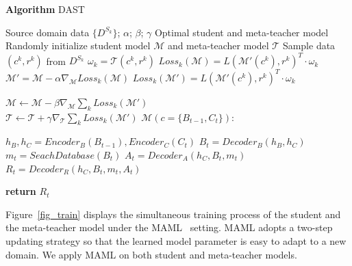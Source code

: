 \documentclass[letterpaper]{article} %
\begin{document}
\begin{algorithm}[t] %
\caption*{\textbf{Algorithm} DAST} %
\label{alg1} %
\begin{algorithmic}
    \renewcommand{\algorithmicrequire}{\textbf{Input:}}
    \REQUIRE Source domain data $\{D^{S_k}\}$; $\alpha$; $\beta$; $\gamma$
    \renewcommand{\algorithmicensure}{\textbf{Output:}}
    \ENSURE Optimal student and meta-teacher model
        \STATE Randomly initialize student model $\mathcal{M}$ and meta-teacher model $\mathcal{T}$
        \STATE Sample data $(c^k, {r}^k)$ from $D^{S_k}$
        \STATE $\omega_k = \mathcal{T}(c^k, {r}^k)$
        \STATE $Loss_k(\mathcal{M})={\mathit{L}(\mathcal{M'}(c^k),{r}^k)}^T\cdot \omega_k$
        \STATE $\mathcal{M}'=\mathcal{M}-\alpha \nabla_{\mathcal{M}}Loss_k(\mathcal{M})$
        \STATE $Loss_k(\mathcal{M'})={\mathit{L}(\mathcal{M'}(c^k),{r}^k)}^T\cdot \omega_k$
    \ENDFOR

    $\mathcal{M} \leftarrow \mathcal{M} - \beta \nabla_{\mathcal{M}} \sum_{k} Loss_k(\mathcal{M}')$\\
    $\mathcal{T} \leftarrow \mathcal{T} + \gamma \nabla_{\mathcal{T}} \sum_{k} Loss_k(\mathcal{M}')$
    \ENDWHILE
    \STATE
    \renewcommand{\algorithmicrequire}{\textbf{Student Model}}
    \REQUIRE $\mathcal{M}(c=\{B_{t-1},C_t\}):$

        \STATE $h_B, h_C = Encoder_B(B_{t-1}), Encoder_C(C_t)$
        \STATE $B_t = Decoder_B(h_B, h_C)$
        \STATE $m_t = SeachDatabase(B_t)$
        \STATE $A_t = Decoder_A(h_C, B_t, m_t)$
        \STATE $R_t = Decoder_R(h_C,B_t,m_t, A_t)$

        \STATE \textbf{return} $R_t$
\end{algorithmic}
\end{algorithm}

Figure~\ref{fig_train} displays the simultaneous training process of the student and the meta-teacher model under the MAML~\citep{finn2017model} setting. MAML adopts a two-step updating strategy so that the learned model parameter is easy to adapt to a new domain. We apply MAML on both student and meta-teacher models.
\end{document}
